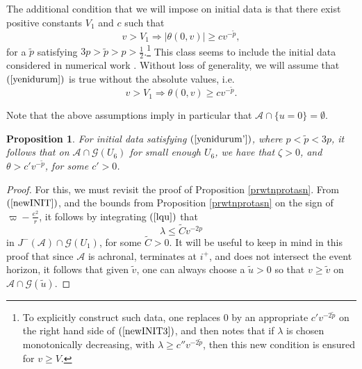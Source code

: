 \documentclass{article}
\newtheorem{proposition}[theorem]{Proposition}
\begin{document}
{The additional condition that we will impose on initial data
is that there exist positive constants $V_1$ and $c$ such that 
\begin{equation}
\label{yenidurum}
v>V_1\Rightarrow
\left|\theta(0,v)\right|\ge cv^{-\tilde{p}},
\end{equation}
for a $\tilde{p}$ satisfying $3p>\tilde{p}>p>\frac12$.\footnote{To 
explicitly construct such data, one replaces $0$ by an appropriate
$c'v^{-2\tilde{p}}$ on the right hand side of $(\ref{newINIT3})$,
and then notes that if $\lambda$ is chosen monotonically
decreasing, with $\lambda\ge c''v^{-2\tilde{p}}$, then this new
condition is ensured for $v\ge V$.}
This class seems to include
the initial data considered in numerical work \cite{brsm:bhs}.
Without loss of generality, we will assume that
$(\ref{yenidurum})$ is true without the absolute values,
i.e.
\begin{equation}
\label{yenidurum'}
v>V_1\Rightarrow
\theta(0,v)\ge cv^{-\tilde{p}}.
\end{equation}

Note that the above assumptions imply in particular that
$\mathcal{A}\cap\{u=0\}=\emptyset$. 

\begin{proposition}
For initial data satisfying $(\ref{yenidurum'})$, where
$p<\tilde{p}<3p$,
it follows that on $\mathcal{A}\cap\mathcal{G}(U_6)$ for small enough $U_6$,
we have that $\zeta>0$, and $\theta>c'v^{-\tilde{p}}$, for some $c'>0$.
\end{proposition}

\begin{proof} For this, we must revisit the proof of
Proposition \ref{prwtnprotasn}. From $(\ref{newINIT})$,
and the bounds from Proposition \ref{prwtnprotasn} on the
sign of $\varpi-\frac{e^2}r$, it follows by integrating $(\ref{lqu})$
that 
\[
\lambda\le\tilde{C}v^{-2p}
\]
in $J^-(\mathcal{A})\cap\mathcal{G}(U_1)$, 
for some $\tilde{C}>0$.
It will be useful to keep in mind in this
proof that since $\mathcal{A}$ is
achronal, terminates at $i^+$,
and does not intersect the event horizon, it follows
that given $\tilde{v}$, one can always choose a $\tilde{u}>0$ so that
$v\ge\tilde{v}$ on $\mathcal{A}\cap\mathcal{G}(\tilde{u})$.


\end{proof}}
\end{document}
